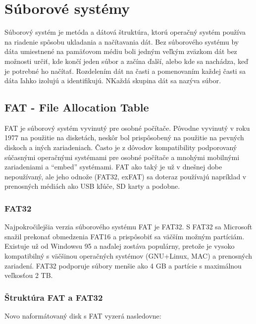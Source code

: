 \documentclass[12pt,oneside,slovak,a4paper]{article}
\begin{document}

\section{Súborové systémy}
Súborový systém je metóda a dátová štruktúra, ktorú operačný systém používa na riadenie spôsobu ukladania a načítavania dát. Bez súborového systému by dáta umiestnené na pamäťovom médiu boli jedným veľkým zväzkom dát bez možnosti určiť, kde končí jeden súbor a začína ďalší, alebo kde sa nachádza, keď je potrebné ho načítať. Rozdelením dát na časti a pomenovaním každej časti sa dáta ľahko izolujú a identifikujú. NKaždá skupina dát sa nazýva súbor.

\subsection{FAT - File Allocation Table}
FAT je súborový systém vyvinutý pre osobné počítače. Pôvodne vyvinutý v roku 1977 na použitie na disketách, neskôr bol prispôsobený na použitie na pevných diskoch a iných zariadeniach. Často je z dôvodov kompatibility podporovaný súčasnými operačnými systémami pre osobné počítače a mnohými mobilnými zariadeniami a ``embed'' systémami. FAT ako taký je už v dnešnej dobe nepoužívaný, ale jeho odnože (FAT32, exFAT) sa doteraz používajú napríklad v prenosných médiách ako USB kľúče, SD karty a podobne.

\subsubsection{FAT32}
Najpokročilejšia verzia súborového systému FAT je FAT32. S FAT32 sa Microsoft snažil prekonať obmedzenia FAT16 a prispôsobiť sa väčším možným partíciám. Existuje už od Windowsu 95 a naďalej zostáva populárny, pretože je vysoko kompatibilný s väčšinou operačných systémov (GNU+Linux, MAC) a prenosných zariadení. FAT32 podporuje súbory menšie ako 4 GB a partície s maximálnou veľkosťou 2 TB.

\subsubsection{Štruktúra FAT a FAT32}
Novo naformátovaný disk s FAT vyzerá nasledovne:
\end{document}
